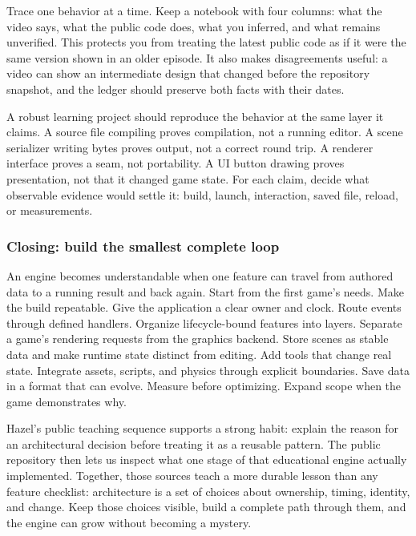 Trace one behavior at a time. Keep a notebook with four columns: what the video says, what the public code does, what you inferred, and what remains unverified. This protects you from treating the latest public code as if it were the same version shown in an older episode. It also makes disagreements useful: a video can show an intermediate design that changed before the repository snapshot, and the ledger should preserve both facts with their dates.

A robust learning project should reproduce the behavior at the same layer it claims. A source file compiling proves compilation, not a running editor. A scene serializer writing bytes proves output, not a correct round trip. A renderer interface proves a seam, not portability. A UI button drawing proves presentation, not that it changed game state. For each claim, decide what observable evidence would settle it: build, launch, interaction, saved file, reload, or measurements.

\subsubsection{Closing: build the smallest complete loop}\label{06-engine-ii-ch042-closing-build-the-smallest-complete-loop}

\hypertarget{06-engine-ii-ch042-closing-build-the-smallest-complete-loop}{}

An engine becomes understandable when one feature can travel from authored data to a running result and back again. Start from the first game's needs. Make the build repeatable. Give the application a clear owner and clock. Route events through defined handlers. Organize lifecycle-bound features into layers. Separate a game's rendering requests from the graphics backend. Store scenes as stable data and make runtime state distinct from editing. Add tools that change real state. Integrate assets, scripts, and physics through explicit boundaries. Save data in a format that can evolve. Measure before optimizing. Expand scope when the game demonstrates why.

Hazel's public teaching sequence supports a strong habit: explain the reason for an architectural decision before treating it as a reusable pattern. The public repository then lets us inspect what one stage of that educational engine actually implemented. Together, those sources teach a more durable lesson than any feature checklist: architecture is a set of choices about ownership, timing, identity, and change. Keep those choices visible, build a complete path through them, and the engine can grow without becoming a mystery.


